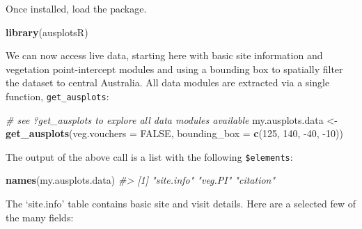 \documentclass[
]{article}
\newenvironment{Shaded}{\begin{snugshade}}{\end{snugshade}}
\newcommand{\CommentTok}[1]{\textcolor[rgb]{0.56,0.35,0.01}{\textit{#1}}}
\newcommand{\DataTypeTok}[1]{\textcolor[rgb]{0.13,0.29,0.53}{#1}}
\newcommand{\DecValTok}[1]{\textcolor[rgb]{0.00,0.00,0.81}{#1}}
\newcommand{\KeywordTok}[1]{\textcolor[rgb]{0.13,0.29,0.53}{\textbf{#1}}}
\newcommand{\NormalTok}[1]{#1}
\newcommand{\OperatorTok}[1]{\textcolor[rgb]{0.81,0.36,0.00}{\textbf{#1}}}
\newcommand{\OtherTok}[1]{\textcolor[rgb]{0.56,0.35,0.01}{#1}}
\newcommand{\StringTok}[1]{\textcolor[rgb]{0.31,0.60,0.02}{#1}}
\begin{document}
Once installed, load the package.

\begin{Shaded}
\begin{Highlighting}[]
\KeywordTok{library}\NormalTok{(ausplotsR)}
\end{Highlighting}
\end{Shaded}

We can now access live data, starting here with basic site information
and vegetation point-intercept modules and using a bounding box to
spatially filter the dataset to central Australia. All data modules are
extracted via a single function, \texttt{get\_ausplots}:

\begin{Shaded}
\begin{Highlighting}[]
\CommentTok{# see ?get_ausplots to explore all data modules available}
\NormalTok{my.ausplots.data <-}\StringTok{ }\KeywordTok{get_ausplots}\NormalTok{(}\DataTypeTok{veg.vouchers =} \OtherTok{FALSE}\NormalTok{, }\DataTypeTok{bounding_box =} \KeywordTok{c}\NormalTok{(}\DecValTok{125}\NormalTok{, }\DecValTok{140}\NormalTok{, }
    \DecValTok{-40}\NormalTok{, }\DecValTok{-10}\NormalTok{))}
\end{Highlighting}
\end{Shaded}

The output of the above call is a list with the following
\texttt{\$elements}:

\begin{Shaded}
\begin{Highlighting}[]
\KeywordTok{names}\NormalTok{(my.ausplots.data)}
\CommentTok{#> [1] "site.info" "veg.PI"    "citation"}
\end{Highlighting}
\end{Shaded}

The `site.info' table contains basic site and visit details. Here are a
selected few of the many fields:

\begin{Shaded}
\end{Shaded}
\end{document}
